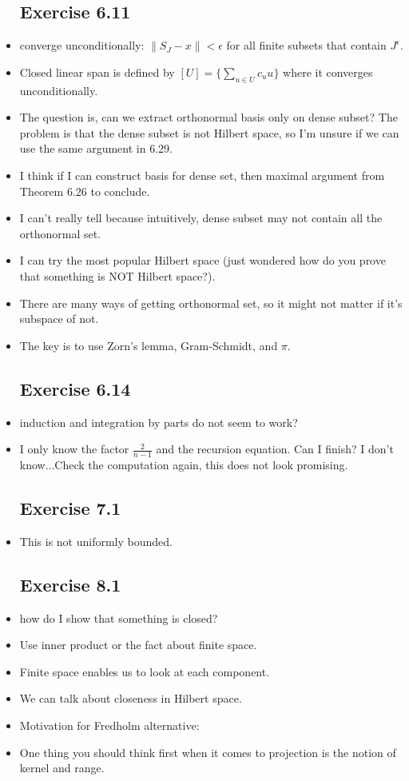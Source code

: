 \documentclass{article}
\theoremstyle{remark}
\begin{document}
\begin{itemize}
\subsection*{Exercise 6.11}
\item converge unconditionally: $\lVert S_J-x\rVert<\epsilon$ for all finite subsets that contain $J^\epsilon$.
\item Closed linear span is defined by $[U]=\{\sum_{u\in U}c_u u\}$ where it converges unconditionally.
\item The question is, can we extract orthonormal basis only on dense subset? The problem is that the dense subset is not Hilbert space, so I'm unsure if we can use the same argument in 6.29.
\item I think if I can construct basis for dense set, then maximal argument from Theorem 6.26 to conclude.
\item I can't really tell because intuitively, dense subset may not contain all the orthonormal set.

\item I can try the most popular Hilbert space (just wondered how do you prove that something is NOT Hilbert space?).
\item There are many ways of getting orthonormal set, so it might not matter if it's subspace of not. 
\item The key is to use Zorn's lemma, Gram-Schmidt, and $\pi$.
\subsection*{Exercise 6.14}
\item induction and integration by parts do not seem to work?
\item I only know the factor $\frac 2{n-1}$ and the recursion equation. Can I finish? I don't know...Check the computation again, this does not look promising.
\subsection*{Exercise 7.1}
\item This is not uniformly bounded.
\subsection*{Exercise 8.1}
\item how do I show that something is closed?
\item Use inner product or the fact about finite space.
\item Finite space enables us to look at each component. 
\item We can talk about closeness in Hilbert space. 
\item Motivation for Fredholm alternative: 
\item One thing you should think first when it comes to projection is the notion of kernel and range.










\end{itemize}
\end{document}
